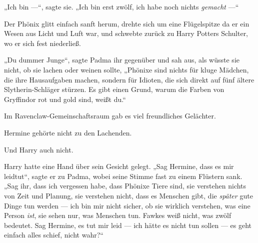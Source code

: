 „Ich bin —“, sagte sie.
„Ich bin erst zwölf, ich habe noch nichts \emph{gemacht} —“

Der Phönix glitt einfach sanft herum, drehte sich um eine Flügelspitze da er ein Wesen aus Licht und Luft war, und schwebte zurück zu Harry Potters Schulter, wo er sich fest niederließ.

„Du dummer Junge“, sagte Padma ihr gegenüber und sah aus, als wüsste sie nicht, ob sie lachen oder weinen sollte,
„Phönixe sind nichts für kluge Mädchen, die ihre Hausaufgaben machen, sondern für Idioten, die sich direkt auf fünf ältere Slytherin-Schläger stürzen. Es gibt einen Grund, warum die Farben von Gryffindor rot und gold sind, weißt du.“

Im Ravenclaw-Gemeinschaftsraum gab es viel freundliches Gelächter.

Hermine gehörte nicht zu den Lachenden.

Und Harry auch nicht.

Harry hatte eine Hand über sein Gesicht gelegt.
„Sag Hermine, dass es mir leidtut“, sagte er zu Padma, wobei seine Stimme fast zu einem Flüstern sank.
„Sag ihr, dass ich vergessen habe, dass Phönixe Tiere sind, sie verstehen nichts von Zeit und Planung, sie verstehen nicht, dass es Menschen gibt, die \emph{später} gute Dinge tun werden — ich bin mir nicht sicher, ob sie wirklich verstehen, was eine Person \emph{ist}, sie sehen nur, was Menschen tun. Fawkes weiß nicht, was zwölf bedeutet. Sag Hermine, es tut mir leid — ich hätte es nicht tun sollen — es geht einfach alles schief, nicht wahr?“

